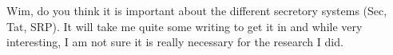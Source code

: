 Wim, do you think it is important about the different secretory systems (Sec, Tat, SRP).
It will take me quite some writing to get it in and while very interesting, 
I am not sure it is really necessary for the research I did.

